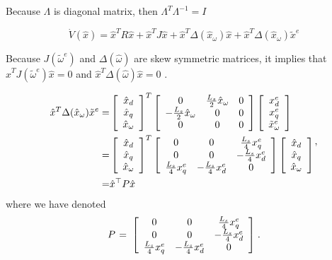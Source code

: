 \documentclass[letterpaper, 10 pt, conference]{ieeeconf}
\newcommand{\m}      {{\hbox{\hskip 1pt}}}
\begin{document}
Because $\Lambda$ is diagonal matrix, then $\Lambda^{T}\Lambda^{-1}=I$

$$
\dot{V}(\hat{x})=\hat{x}^{T}R\hat{x}+\hat{x}^{T}J\hat{x}+\hat{x}^{T}\Delta(\hat{x}_{\omega})\hat{x}+\hat{x}^{T}\Delta(\hat{x}_{\omega})\tilde{x}^{e}
$$

Because $J(\tilde{\omega}^{e})$ and $\Delta(\hat{\omega})$ are skew
symmetric matrices, it implies that $\hat{x}^{T}J(\tilde{\omega}^{e})\hat{x}=0$
and $\hat{x}^{T}\Delta(\hat{\omega})\hat{x}=0$ .

$$
\begin{aligned}
\hat{x}^{T}\Delta(\hat{x}_{\omega})\tilde{x}^{e}  = &\left[\begin{array}{c}
\hat{x}_{d}\\
\hat{x}_{q}\\
\hat{x}_{\omega}
\end{array}\right]^{T}\left[\begin{array}{ccc}
0 & \frac{L_{s}}{2}\hat{x}_{\omega} & 0\\
-\frac{L_{s}}{2}\hat{x}_{\omega} & 0 & 0\\
0 & 0 & 0
\end{array}\right]\left[\begin{array}{c}
x_{d}^{e}\\
x_{q}^{e}\\
\tilde{x}_{\omega}^{e}
\end{array}\right]\\
  =&  \left[\begin{array}{c}
\hat{x}_{d}\\
\hat{x}_{q}\\
\hat{x}_{\omega}
\end{array}\right]^{T}\left[\begin{array}{ccc}
0 & 0 & \frac{L_{s}}{4}x_{q}^{e}\\
0 & 0 & -\frac{L_{s}}{4}x_{d}^{e}\\
\frac{L_{s}}{4}x_{q}^{e} & -\frac{L_{s}}{4}x_{d}^{e} & 0
\end{array}\right]\left[\begin{array}{c}
\hat{x}_{d}\\
\hat{x}_{q}\\
\hat{x}_{\omega}
\end{array}\right]
\\= & \hat{x}^{\top}P\hat{x}
\end{aligned} \m,
$$
where we have denoted
$$ P \m=\m \left[\begin{array}{ccc} 0 & 0 & \frac{L_{s}}{4}
   x_{q}^{e}\\ 0 & 0 & -\frac{L_s}{4} x_d^e\\ \frac{L_s}{4} x_q^e 
   & -\frac{L_s}{4} x_d^e & 0 \end{array}\right] \m.$$
\end{document}
